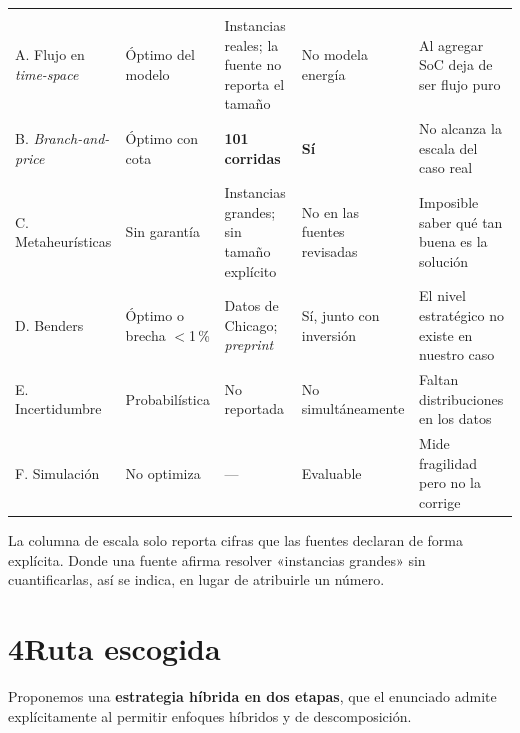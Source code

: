 \documentclass[11pt,a4paper,parskip=half]{scrartcl}
\begin{document}
\begin{longtable}{@{}L{2.5cm}L{2.3cm}L{3.2cm}L{2.4cm}L{4.6cm}@{}}
 &  &  &  &  \\
\endfirsthead
{}
 &  &  &  &  \\
\endhead
\midrule
A. Flujo en \textit{time-space} & Óptimo del modelo & Instancias reales; la fuente no reporta el tamaño & No modela energía & Al agregar SoC deja de ser flujo puro \\
B. \textit{Branch-and-price} & Óptimo con cota & \textbf{101 corridas} \citep{wu_waitingtimebranchprice_2025} & \textbf{Sí} \citep{devos_capacitatedcharging_2024} & No alcanza la escala del caso real \\
C. Metaheurísticas & Sin garantía & Instancias grandes; sin tamaño explícito & No en las fuentes revisadas & Imposible saber qué tan buena es la solución \\
D. Benders & Óptimo o brecha $<$1\,\% & Datos de Chicago; \textit{preprint} & Sí, junto con inversión & El nivel estratégico no existe en nuestro caso \\
E. Incertidumbre & Probabilística & No reportada & No simultáneamente & Faltan distribuciones en los datos \\
F. Simulación & No optimiza & --- & Evaluable & Mide fragilidad pero no la corrige \\
\bottomrule
\end{longtable}

\begin{nota}
La columna de escala solo reporta cifras que las fuentes declaran de forma explícita. Donde una fuente afirma resolver «instancias grandes» sin cuantificarlas, así se indica, en lugar de atribuirle un número.
\end{nota}

\section*{4\quad Ruta escogida}

Proponemos una \textbf{estrategia híbrida en dos etapas}, que el enunciado admite explícitamente al permitir enfoques híbridos y de descomposición.
\end{document}

